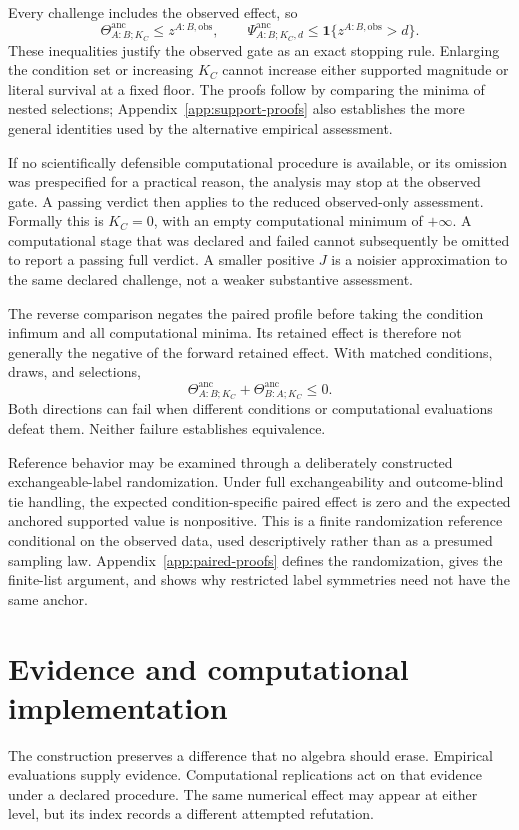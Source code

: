 \documentclass[11pt]{article}
\newcommand{\Psianc}{\Psi^{\mathrm{anc}}}
\newcommand{\Thetaanc}{\Theta^{\mathrm{anc}}}
\theoremstyle{remark}
\begin{document}
Every challenge includes the observed effect, so
\[
\Thetaanc_{A:B;K_C}\leq z^{A:B,\mathrm{obs}},
\qquad
\Psianc_{A:B;K_C,d}\leq\mathbf1\{z^{A:B,\mathrm{obs}}>d\}.
\]
These inequalities justify the observed gate as an exact stopping rule.
Enlarging the condition set or increasing $K_C$ cannot increase either
supported magnitude or literal survival at a fixed floor. The proofs follow
by comparing the minima of nested selections; Appendix~\ref{app:support-proofs}
also establishes the more general identities used by the alternative empirical
assessment.

If no scientifically defensible computational procedure is available, or its
omission was prespecified for a practical reason, the analysis may stop at the
observed gate. A passing verdict then applies to the reduced observed-only
assessment. Formally this is $K_C=0$, with an empty computational minimum of
$+\infty$. A computational stage that was declared and failed cannot
subsequently be omitted to report a passing full verdict. A smaller positive
$J$ is a noisier approximation to the same declared challenge, not a weaker
substantive assessment.

The reverse comparison negates the paired profile before taking the condition
infimum and all computational minima. Its retained effect is therefore not
generally the negative of the forward retained effect. With matched
conditions, draws, and selections,
\[
\Thetaanc_{A:B;K_C}+\Thetaanc_{B:A;K_C}\leq0.
\]
Both directions can fail when different conditions or computational
evaluations defeat them. Neither failure establishes equivalence.

Reference behavior may be examined through a deliberately constructed
exchangeable-label randomization. Under full exchangeability and outcome-blind
tie handling, the expected condition-specific paired effect is zero and the
expected anchored supported value is nonpositive. This is a finite
randomization reference conditional on the observed data, used descriptively
rather than as a presumed sampling law. Appendix~\ref{app:paired-proofs}
defines the randomization, gives the finite-list argument, and shows why
restricted label symmetries need not have the same anchor.

\section{Evidence and computational implementation}
\label{sec:evidence}

The construction preserves a difference that no algebra should erase. Empirical
evaluations supply evidence. Computational replications act on that evidence
under a declared procedure. The same numerical effect may appear at either
level, but its index records a different attempted refutation.
\end{document}
